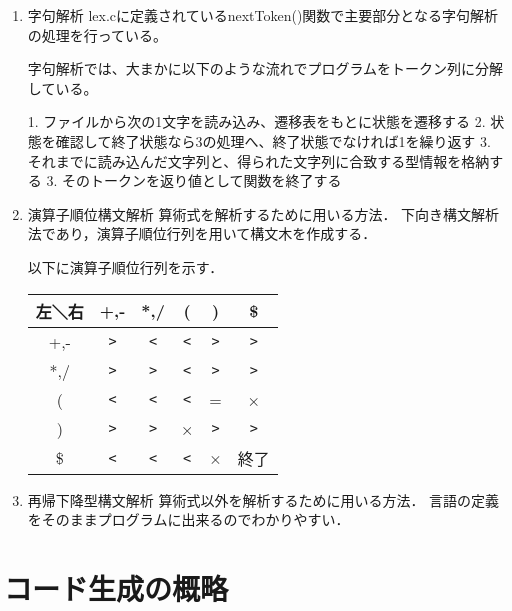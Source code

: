 \documentclass[11pt,a4j]{jarticle}
\begin{document}
\begin{enumerate}
\item{字句解析}
lex.cに定義されているnextToken()関数で主要部分となる字句解析の処理を行っている。

字句解析では、大まかに以下のような流れでプログラムをトークン列に分解している。

1. ファイルから次の1文字を読み込み、遷移表をもとに状態を遷移する
2. 状態を確認して終了状態なら3の処理へ、終了状態でなければ1を繰り返す
3. それまでに読み込んだ文字列と、得られた文字列に合致する型情報を格納する
3. そのトークンを返り値として関数を終了する



\item{演算子順位構文解析}
算術式を解析するために用いる方法．
下向き構文解析法であり，演算子順位行列を用いて構文木を作成する．

以下に演算子順位行列を示す．
\begin{table}[h]
\centering
\begin{tabular}{|c|c|c|c|c|c|}\hline
左＼右 & +,- & *,/ & ( & ) & \$\\ \hline
+,- & \verb|>| & \verb|<| & \verb|<| & \verb|>| & \verb|>| \\ \hline
*,/ & \verb|>| & \verb|>| & \verb|<| & \verb|>| & \verb|>| \\ \hline
( & \verb|<| & \verb|<| & \verb|<| & = & × \\ \hline
) & \verb|>| & \verb|>| & × & \verb|>| & \verb|>| \\ \hline
\$ & \verb|<| & \verb|<| & \verb|<| & × & 終了 \\ \hline
\end{tabular}
\end{table}


\item{再帰下降型構文解析}
算術式以外を解析するために用いる方法．
言語の定義をそのままプログラムに出来るのでわかりやすい．

\end{enumerate}



\section{コード生成の概略}
\end{document}
